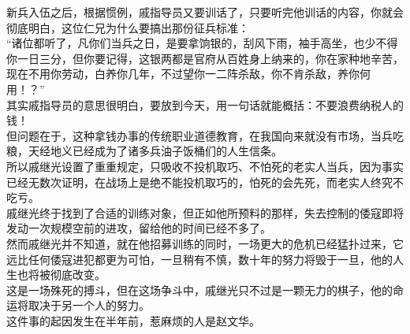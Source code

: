 \begin{multicols}{\theparacolNo}
新兵入伍之后，根据惯例，戚指导员又要训话了，只要听完他训话的内容，你就会彻底明白，这位仁兄为什么要搞出那份征兵标准：\\

“诸位都听了，凡你们当兵之日，是要拿饷银的，刮风下雨，袖手高坐，也少不得你一日三分，但你要记得，这银两都是官府从百姓身上纳来的，你在家种地辛苦，现在不用你劳动，白养你几年，不过望你一二阵杀敌，你不肯杀敌，养你何用！？”\\

其实戚指导员的意思很明白，要放到今天，用一句话就能概括：不要浪费纳税人的钱！\\

但问题在于，这种拿钱办事的传统职业道德教育，在我国向来就没有市场，当兵吃粮，天经地义已经成为了诸多兵油子饭桶们的人生信条。\\

所以戚继光设置了重重规定，只吸收不投机取巧、不怕死的老实人当兵，因为事实已经无数次证明，在战场上是绝不能投机取巧的，怕死的会先死，而老实人终究不吃亏。\\

戚继光终于找到了合适的训练对象，但正如他所预料的那样，失去控制的倭寇即将发动一次规模空前的进攻，留给他的时间已经不多了。\\

然而戚继光并不知道，就在他招募训练的同时，一场更大的危机已经猛扑过来，它远比任何倭寇进犯都更为可怕，一旦稍有不慎，数十年的努力将毁于一旦，他的人生也将被彻底改变。\\

这是一场殊死的搏斗，但在这场争斗中，戚继光只不过是一颗无力的棋子，他的命运将取决于另一个人的努力。\\

这件事的起因发生在半年前，惹麻烦的人是赵文华。\\
\ifnum{}
	\end{multicols}
\fi
\newpage
